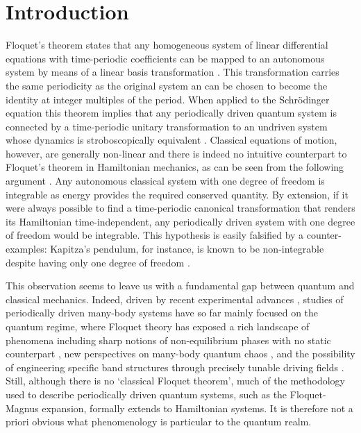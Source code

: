 \documentclass[aps,pre,twocolumn,notitlepage,floats,10pt]{revtex4-1}
\begin{document}
\section{Introduction}
Floquet's theorem states that any homogeneous system of linear differential
equations with time-periodic coefficients can be mapped to an autonomous system
by means of a linear basis transformation \cite{Floquet-1883}.
This transformation carries the same periodicity as the original system an can
be chosen to become the identity at integer multiples of the period. 
When applied to the Schr\"odinger equation this theorem implies that any
periodically driven quantum system is connected by a time-periodic unitary
transformation to an undriven system whose dynamics is stroboscopically
equivalent \cite{Kitagawa-Oka-Brataas-Fu-Demler,Sambe,Torres-Kunold,
Bukov-DAlessio-Polkovnikov-review,Eckardt-rmp}.
Classical equations of motion, however, are generally non-linear and there is
indeed no intuitive counterpart to Floquet's theorem in Hamiltonian mechanics,
as can be seen from the following argument \cite{Anatoli-acknowledgement}.
Any autonomous classical system with one degree of freedom is integrable as
energy provides the required conserved quantity.
By extension, if it were always possible to find a time-periodic canonical
transformation that renders its Hamiltonian time-independent, any periodically
driven system with one degree of freedom would be integrable. 
This hypothesis is easily falsified by a counter-examples: Kapitza's pendulum,
for instance, is known to be non-integrable despite having only one degree of
freedom \cite{Arnold,Broer-Krauskopf,Landau-Lifshitz}.

This observation seems to leave us with a fundamental gap between quantum and
classical mechanics.
Indeed, driven by recent experimental advances \cite{KWW},
studies of periodically driven many-body systems have so far mainly focused on
the quantum regime, where Floquet theory has exposed a rich landscape of
phenomena including sharp notions of non-equilibrium phases with no static
counterpart \cite{Khemani-PRL,Curt-phase}, new perspectives on many-body quantum
chaos \cite{Chalker-PRX}, and the possibility of engineering specific band
structures through precisely tunable driving fields
\cite{Weitenberg-Simonet,Rudner}.
Still, although there is no `classical Floquet theorem', much of the methodology
used to describe periodically driven quantum systems, such as the Floquet-Magnus
expansion, formally extends to Hamiltonian systems.
It is therefore not a priori obvious what phenomenology is particular to the
quantum realm.
\end{document}
